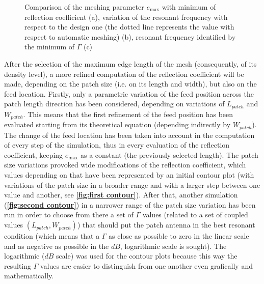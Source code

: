 \documentclass[10 pt,a4paper,twocolumn]{article}
\begin{document}
{\begin{figure}[bt!]
\begin{subfigure}[t]{0.32\linewidth}
		\caption{}
		\label{eq:Df vs mesh}
	\end{subfigure}
	\hfill
	\begin{subfigure}[t]{0.32\linewidth}
		\def\svgwidth{\linewidth}
		\tiny{}
		
		\caption{}
		\label{eq:f vs mesh}
	\end{subfigure}
	\hfill
	\caption{Comparison of the meshing parameter $e_{\max}$ with minimum of reflection coefficient (a), variation of the resonant frequency with respect to the design one (the dotted line represents the value with respect to automatic meshing) (b), resonant frequency identified by the minimum of $\Gamma$ (c)} 
\end{figure}
After the selection of the maximum edge length of the mesh (consequently, of its density level), a more refined computation of the reflection coefficient will be made, depending on the patch size (i.e. on its length and width), but also on the feed location. Firstly, only a parametric variation of the feed position across the patch length direction has been considered, depending on variations of $L_{patch}$ and $W_{patch}$. This means that the first refinement of the feed position has been evaluated starting from its theoretical equation (depending indirectly by $W_{patch}$). The change of the feed location has been taken into account in the computation of every step of the simulation, thus in every evaluation of the reflection coefficient, keeping $e_{\max}$ as a constant (the previously selected length). The patch size variations provoked wide modifications of the reflection coefficient, which values depending on that have been represented by an initial contour plot (with variations of the patch size in a broader range and with a larger step between one value and another, see \textbf{\cref{fig:first contour}}). After that, another simulation (\textbf{\cref{fig:second contour}}) in a narrower range of the patch size variation has been run in order to choose from there a set of $\Gamma$ values (related to a set of coupled values $(L_{patch},W_{patch})$) that should put the patch antenna in the best resonant condition (which means that a $\Gamma$ as close as possible to zero in the linear scale and as negative as possible in the $dB$, logarithmic scale is sought). The logarithmic ($dB$ scale) was used for the contour plots because this way the resulting $\Gamma$ values are easier to distinguish from one another even grafically and mathematically. 


}
\end{document}
